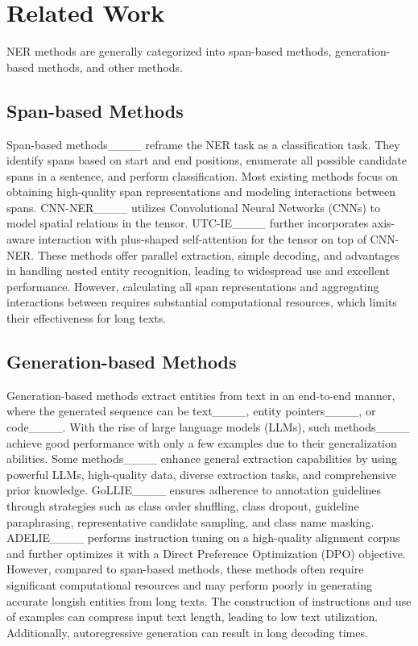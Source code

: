 \section{Related Work}
NER methods are generally categorized into span-based methods, generation-based methods, and other methods.

\subsection{Span-based Methods}

Span-based methods____ reframe the NER task as a \tokenspan
classification task. 
They identify spans based on start and end positions, enumerate all possible candidate spans in a sentence, and perform classification. 
Most existing methods focus on obtaining high-quality span representations and modeling interactions between spans.
CNN-NER____ utilizes Convolutional Neural Networks (CNNs) to model spatial relations in the \tokenspan tensor. 
UTC-IE____ further incorporates axis-aware interaction with plus-shaped self-attention for the \tokenspan tensor on top of CNN-NER.
These methods offer parallel extraction, simple decoding, and advantages in handling nested entity recognition, leading to widespread use and excellent performance. 
However, calculating all span representations and aggregating interactions between \tokenspans requires substantial computational resources, which limits their effectiveness for long texts. 

\subsection{Generation-based Methods}

Generation-based methods extract entities from text in an end-to-end manner, 
where the generated sequence can be 
text____, entity pointers____, or code____. 
With the rise of large language models (LLMs), such methods____ achieve good performance with only a few examples due to their generalization abilities. 
Some methods____ enhance general extraction capabilities by using powerful LLMs, high-quality data, diverse extraction tasks, and comprehensive prior knowledge. 
GoLLIE____ ensures adherence to annotation guidelines through strategies such as class order shuffling, class dropout, guideline paraphrasing, representative candidate sampling, and class name masking. 
ADELIE____ performs instruction tuning
on a high-quality alignment corpus and further optimizes it with a Direct Preference Optimization (DPO) objective. 
However, compared to span-based methods,
these methods often require significant computational resources and may perform poorly in generating accurate longish entities from long texts.
The construction of instructions and use of examples can compress input text length, leading to low text utilization. Additionally, autoregressive generation can result in long decoding times. 

